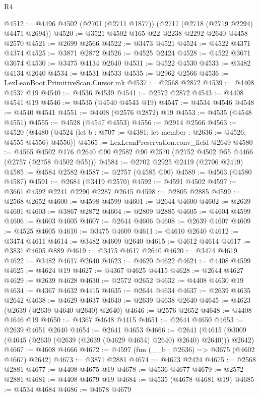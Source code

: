 \begin{lexlean}{R4}
\begin{coremodule}
@4512 := @4496 @4502 (@2701 (@2711 @1877)) (@2717 (@2718 (@2719 @2294) @4471 @2694))
@4520 := @3521 @4502 @165 @22 @2238 @2292 @2640 @4458 @2570
@4521 := @2699 @2566
@4522 := @3473 @4521
@4524 := @4522 @4371 @4374
@4525 := @3871 @2872
@4526 := @4525 @2424
@4528 := @4522 @3671 @3674
@4530 := @3475 @4134 @2640
@4531 := @4522 @4530
@4533 := @3482 @4134 @2640
@4534 := @4531 @4533
@4535 := @2962 @2566
@4536 := LexLeanBoot.PrimitiveScan.Cursor.mk
@4537 := @2568 @2872
@4539 := @4408 @4537 @19
@4540 := @4536 @4539
@4541 := @2572 @2872
@4543 := @4408 @4541 @19
@4546 := @4535 (@4540 @4543 @19)
@4547 := @4534 @4546
@4548 := @4540 @4541
@4551 := @4408 (@2576 @2872) @19
@4553 := @4535 (@4548 @4551)
@4555 := @4528 (@4547 @4553)
@4556 := @2914 @2566
@4563 := @4520
    (@4480 (@4524 (let b : @707 := @4381; let member : @2636 := @4526; @4555 @4556) @4556))
@4565 := LexLeanPreservation.conv_field @2649
@4580 := @4565
    @4502
    @176
    @2640
    @90
    @2582
    @90
    @2570
    (@2752 @4502 @55 @4466 (@2757 (@2758 @4502 @55)))
@4584 := @2702 @2925 @2419 (@2706 @2419)
@4585 := @4584 @2582
@4587 := @2757 (@4585 @90)
@4589 := @4563 (@4580 @4587)
@4591 := @2684 (@3419 @2570)
@4592 := @4591 @4502
@4597 := @3661 @4592 @2241 @2290 @2287 @2645
@4598 := @2805 @2885
@4599 := @2568 @2652
@4600 := @4598 @4599
@4601 := @2644 @4600
@4602 := @2639 @4601
@4603 := @3867 @2872
@4604 := @2809 @2885
@4605 := @4604 @4599
@4606 := @4603 @4605
@4607 := @2644 @4606
@4608 := @2639 @4607
@4609 := @4525 @4605
@4610 := @3475 @4609
@4611 := @4610 @2640
@4612 := @3474 @4611
@4614 := @3482 @4609 @2640
@4615 := @4612 @4614
@4617 := @3831 @4605 @889
@4619 := @3475 @4617 @2640
@4620 := @3474 @4619
@4622 := @3482 @4617 @2640
@4623 := @4620 @4622
@4624 := @4408 @4599
@4625 := @4624 @19
@4627 := @4367 @4625 @4415
@4628 := @2644 @4627
@4629 := @2639 @4628
@4630 := @2572 @2652
@4632 := @4408 @4630 @19
@4634 := @4367 @4632 @4415
@4635 := @2644 @4634
@4637 := @2639 @4635 @2642
@4638 := @4629 @4637
@4640 := @2639 @4638 @2640
@4645 := @4623 (@2639 (@2639 @4640 @2640) @2640)
@4646 := @2576 @2652
@4648 := @4408 @4646 @19
@4650 := @4367 @4648 @4415
@4651 := @2644 @4650
@4653 := @2639 @4651 @2640
@4654 := @2641 @4653
@4666 := @2641 (@4615 (@3009 (@4645 (@2639 (@2639 (@2639 (@4629 @4654) @2640) @2640) @2640))) @2642)
@4667 := @4608 @4666
@4672 := @4597 (fun (__b : @2636) => @3675 (@4602 @4667) @2642)
@4673 := @3871 @2881
@4674 := @4673 @2424
@4675 := @2568 @2881
@4677 := @4408 @4675 @19
@4678 := @4536 @4677
@4679 := @2572 @2881
@4681 := @4408 @4679 @19
@4684 := @4535 (@4678 @4681 @19)
@4685 := @4534 @4684
@4686 := @4678 @4679

\end{coremodule}
\end{lexlean}
